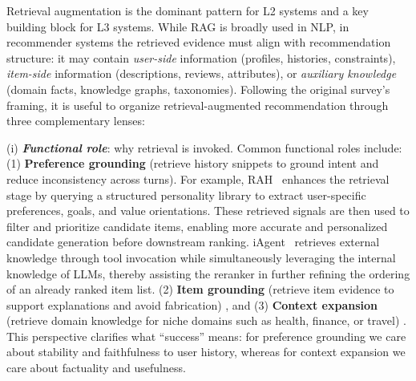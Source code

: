 {Retrieval augmentation is the dominant pattern for L2 systems and a key building block for L3 systems. While RAG is broadly used in NLP, in recommender systems the retrieved evidence must align with recommendation structure: it may contain \emph{user-side} information (profiles, histories, constraints), \emph{item-side} information (descriptions, reviews, attributes), or \emph{auxiliary knowledge} (domain facts, knowledge graphs, taxonomies).
Following the original survey’s framing, it is useful to organize retrieval-augmented recommendation through three complementary lenses: 

{{(i) \textbf{\textit{Functional role}}: why retrieval is invoked.}
Common functional roles include:
(1) \textbf{Preference grounding} (retrieve history snippets to ground intent and reduce inconsistency across turns). 
For example, RAH~\cite{shu2024rah} enhances the retrieval stage by querying a structured personality library to extract user-specific preferences, goals, and value orientations. These retrieved signals are then used to filter and prioritize candidate items, enabling more accurate and personalized candidate generation before downstream ranking.
iAgent~\cite{xu2025iagent} retrieves external knowledge through tool invocation while simultaneously leveraging the internal knowledge of LLMs, thereby assisting the reranker in further refining the ordering of an already ranked item list.
(2) \textbf{Item grounding} (retrieve item evidence to support explanations and avoid fabrication) \cite{kim2025itemrag,bhattacharya2025recbygen},
and (3) \textbf{Context expansion} (retrieve domain knowledge for niche domains such as health, finance, or travel) \cite{maragheh2025arag,borgeaud2022improving,zhao2025webrec,cho2025marc,banerjee2024enhancing, rao2024ramo}.
This perspective clarifies what “success” means: \eg for preference grounding we care about stability and faithfulness to user history, whereas for context expansion we care about factuality and usefulness.} 

}
